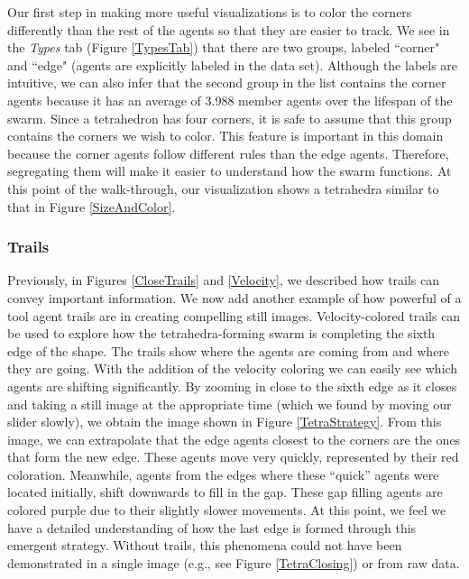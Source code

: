 \documentclass{vgtc}
\begin{document}
Our first step in making more useful visualizations is to color the corners differently than the rest of the agents so that
they are easier to track. We see in the \textit{Types} tab (Figure \ref{TypesTab}) that there are two groups, labeled
``corner" and ``edge" (agents are explicitly labeled in the data set). Although the labels are intuitive, we can also infer that the second group in the list contains the corner agents because it has an average of 3.988 member agents over the lifespan of the swarm.
Since a tetrahedron has four corners, it is safe to assume that this group contains the corners we wish to color.
This feature is important in this domain because the corner agents follow different rules than the edge agents.
Therefore, segregating them will make it easier to understand how the swarm functions.
At this point of the walk-through, our visualization shows a tetrahedra similar to that in Figure \ref{SizeAndColor}.




\subsubsection{Trails}

Previously, in Figures \ref{CloseTrails} and \ref{Velocity}, we described how trails can convey important information.
We now add another example of how powerful of a tool agent trails are in creating compelling still images.
Velocity-colored trails can be used to explore how the tetrahedra-forming swarm is completing the sixth edge of the shape.
The trails show where the agents are coming from and where they are going.
With the addition of the velocity coloring we can easily see which agents are shifting significantly.
By zooming in close to the sixth edge as it closes and taking a still image at the appropriate time (which we found
by moving our slider slowly), we obtain the image shown in Figure \ref{TetraStrategy}.
From this image, we can extrapolate that the edge agents closest to the corners are the ones that form the new edge.
These agents move very quickly, represented by their red coloration.
Meanwhile, agents from the edges where these ``quick'' agents were located initially, shift downwards to fill in the gap.
These gap filling agents are colored purple due to their slightly slower movements.
At this point, we feel we have a detailed understanding of how the last edge is formed through this emergent strategy.
Without trails, this phenomena could not have been demonstrated in a single image (e.g., see Figure \ref{TetraClosing})
or from raw data.
\end{document}
